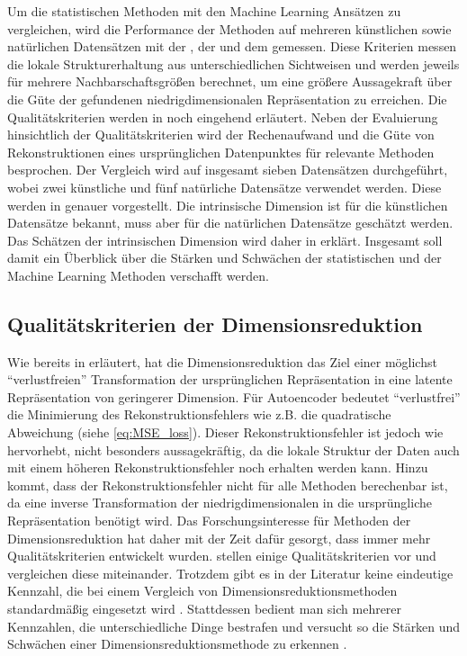 Um die statistischen Methoden mit den Machine Learning Ansätzen zu vergleichen, wird die
Performance der Methoden auf mehreren künstlichen sowie natürlichen Datensätzen mit der
, der  und dem  gemessen. Diese Kriterien messen die lokale Strukturerhaltung aus unterschiedlichen
Sichtweisen und werden jeweils für mehrere Nachbarschaftsgrößen berechnet, um eine größere
Aussagekraft über die Güte der gefundenen niedrigdimensionalen Repräsentation zu erreichen. Die
Qualitätskriterien werden in  noch
eingehend erläutert. Neben der Evaluierung hinsichtlich der Qualitätskriterien wird der
Rechenaufwand und die Güte von Rekonstruktionen eines ursprünglichen Datenpunktes für relevante
Methoden besprochen. Der Vergleich wird auf insgesamt sieben Datensätzen durchgeführt, wobei zwei
künstliche und fünf natürliche Datensätze verwendet werden. Diese werden in
 genauer vorgestellt. Die intrinsische Dimension ist
für die künstlichen Datensätze bekannt, muss aber für die natürlichen Datensätze geschätzt werden.
Das Schätzen der intrinsischen Dimension wird daher in
 erklärt. Insgesamt soll
damit ein Überblick über die Stärken und Schwächen der statistischen und der Machine Learning
Methoden verschafft werden.

\subsection{Qualitätskriterien der Dimensionsreduktion}
\label{ch:Vergleich:sec:Methodik:subsec:Qualitaetskriterien}
Wie bereits in  erläutert, hat die Dimensionsreduktion das Ziel einer möglichst \enquote{verlustfreien} Transformation der ursprünglichen Repräsentation in eine latente Repräsentation von geringerer Dimension. Für Autoencoder bedeutet \enquote{verlustfrei} die Minimierung des Rekonstruktionsfehlers wie z.B. die quadratische Abweichung (siehe \eqref{eq:MSE_loss}). Dieser Rekonstruktionsfehler ist jedoch wie \textcite[18]{vanderMaaten.2009} hervorhebt, nicht besonders aussagekräftig, da die lokale Struktur der Daten auch mit einem höheren Rekonstruktionsfehler noch erhalten werden kann. Hinzu kommt, dass der Rekonstruktionsfehler nicht für alle Methoden berechenbar ist, da eine inverse Transformation der niedrigdimensionalen in die ursprüngliche Repräsentation benötigt wird. Das Forschungsinteresse für Methoden der Dimensionsreduktion hat daher mit der Zeit dafür gesorgt, dass immer mehr Qualitätskriterien entwickelt wurden. \textcite{Gracia.2014} stellen einige Qualitätskriterien vor und vergleichen diese miteinander. Trotzdem gibt es in der Literatur keine eindeutige Kennzahl, die bei einem Vergleich von Dimensionsreduktionsmethoden standardmäßig eingesetzt wird \parencite[vgl.][1 -- 2]{Lee.2009}. Stattdessen bedient man sich mehrerer Kennzahlen, die
unterschiedliche Dinge bestrafen und versucht so die Stärken und Schwächen einer
Dimensionsreduktionsmethode zu erkennen \parencite[486]{Venna.2001}.


